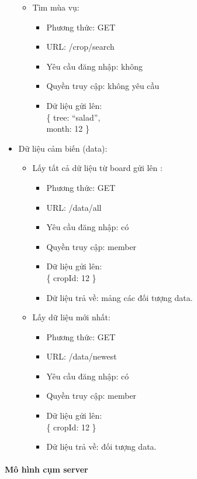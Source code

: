 \documentclass[a4paper,12pt,oneside]{article}
\begin{document}
\begin{itemize}
\begin{itemize}
\item Tìm mùa vụ:
	\begin{itemize}
	\item Phương thức: GET
	\item URL: /crop/search
	\item Yêu cầu đăng nhập: không
	\item Quyền truy cập: không yêu cầu
	\item Dữ liệu gửi lên:\\ 
		\{
			tree: “salad”,\\
			month: 12
		\}
	\end{itemize}
\end{itemize}
\item Dữ liệu cảm biến (data):

\begin{itemize}
\item Lấy tất cả dữ liệu từ board gửi lên :
	\begin{itemize}
	\item Phương thức: GET
	\item URL: /data/all
	\item Yêu cầu đăng nhập: có
	\item Quyền truy cập: member
	\item Dữ liệu gửi lên:\\ 
		\{
			cropId: 12
		\}
	\item Dữ liệu trả về: mảng các đối tượng data.
	\end{itemize}
	
\item Lấy dữ liệu mới nhất:
	\begin{itemize}
	\item Phương thức: GET
	\item URL: /data/newest
	\item Yêu cầu đăng nhập: có
	\item Quyền truy cập: member
	\item Dữ liệu gửi lên:\\ 
		\{
			cropId: 12
		\}
	\item Dữ liệu trả về: đối tượng data.
	\end{itemize}
\end{itemize}

\end{itemize}

\paragraph{Mô hình cụm server}
\end{document}
